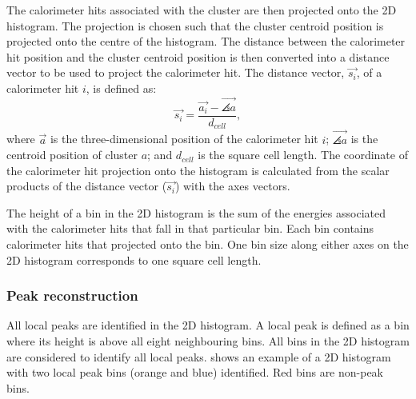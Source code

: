 The calorimeter hits associated with the cluster are then projected onto the 2D histogram. The projection is chosen such that the cluster centroid position is projected onto the centre of the histogram. The distance between the calorimeter hit position and the cluster centroid position is then converted into a distance vector to be used to project the calorimeter hit. The distance vector, $\vec{s_{i}}$, of a calorimeter hit $i$, is defined as:
\begin{equation}
\vec{s_{i}} = \frac{\vec{a_{i}} -  \vec{\angles{a}}}{d_{cell}},
\end{equation}
where $\vec{a}$ is the three-dimensional position of the calorimeter hit $i$;  $\vec{\angles{a}}$ is the centroid position of cluster $a$; and $d_{cell}$ is the  \ECAL square cell length. The coordinate of the calorimeter hit projection onto the histogram is calculated from the scalar products of the distance vector ($\vec{s_{i}}$) with the axes vectors.

The height of a bin in the 2D histogram is the sum of the energies associated with the calorimeter hits that fall in that particular bin. Each bin contains calorimeter hits that projected onto the bin. One bin size along either axes on the 2D histogram corresponds to one \ECAL square cell length.


\subsubsection{Peak reconstruction}

All local peaks are identified in the 2D histogram. A local peak is defined as a bin where its height is above all eight neighbouring bins. All bins in the 2D histogram are  considered to identify all local peaks.  shows an example of a 2D histogram with two local peak bins (orange and blue) identified. Red bins are non-peak bins.




